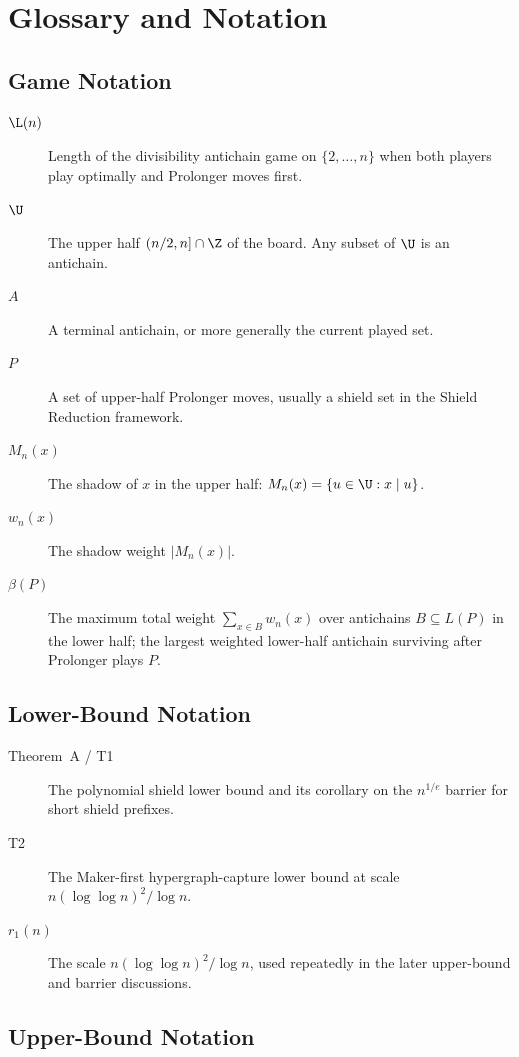 \section{Glossary and Notation}\label{app:glossary}

\subsection{Game Notation}

\begin{description}
  \item[$\L(n)$] Length of the divisibility antichain game on $\{2,\dots,n\}$
  when both players play optimally and Prolonger moves first.
  \item[$\U$] The upper half $(n/2,n]\cap \Z$ of the board.  Any subset
  of $\U$ is an antichain.
  \item[$A$] A terminal antichain, or more generally the current played set.
  \item[$P$] A set of upper-half Prolonger moves, usually a shield set in the
  Shield Reduction framework.
  \item[$M_n(x)$] The shadow of $x$ in the upper half:
  $M_n(x)=\{u\in \U: x\mid u\}$.
  \item[$w_n(x)$] The shadow weight $|M_n(x)|$.
  \item[$\beta(P)$] The maximum total weight $\sum_{x\in B}w_n(x)$ over antichains
  $B\subseteq L(P)$ in the lower half; the largest weighted lower-half antichain
  surviving after Prolonger plays $P$.
\end{description}

\subsection{Lower-Bound Notation}

\begin{description}
  \item[Theorem~A / T1] The polynomial shield lower bound and its corollary on
  the $n^{1/e}$ barrier for short shield prefixes.
  \item[T2] The Maker-first hypergraph-capture lower bound at scale
  $n(\log\log n)^2/\log n$.
  \item[$r_1(n)$] The scale $n(\log\log n)^2/\log n$, used repeatedly in the
  later upper-bound and barrier discussions.
\end{description}

\subsection{Upper-Bound Notation}

